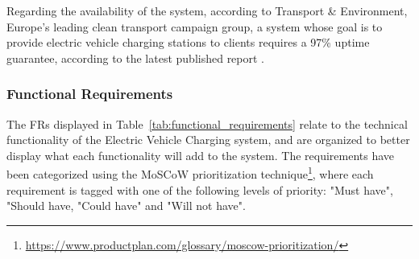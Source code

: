 Regarding the availability of the system, according to Transport \& Environment, Europe's leading clean transport campaign group, a system whose goal is to provide electric vehicle charging stations to clients requires a 97\% uptime guarantee, according to the latest published report \cite{todts_2020}.

\subsubsection{Functional Requirements}

The \glspl{FR} displayed in Table~\ref{tab:functional_requirements} relate to the technical functionality of the Electric Vehicle Charging system, and are organized to better display what each functionality will add to the system. The requirements have been categorized using the MoSCoW prioritization technique\footnote{\url{https://www.productplan.com/glossary/moscow-prioritization/}}, where each requirement is tagged with one of the following levels of priority: "Must have", "Should have, "Could have" and "Will not have".

